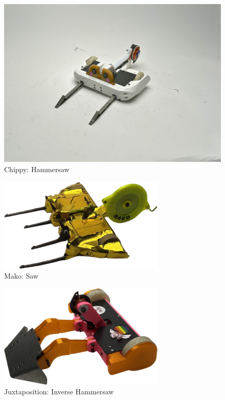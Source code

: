 \documentclass[conference]{IEEEtran}
\begin{document}
\begin{figure}[htp]
\centering
\includegraphics[scale=0.05]{chippy.jpg}
\caption{Chippy: Hammersaw \cite{b2}}
\label{Chippy: Hammersaw}
\end{figure}

\begin{figure}[htp]
\centering
\includegraphics[scale=0.4]{mako.png}
\caption{Mako: Saw \cite{b2}}
\label{Mako: Saw}
\end{figure}

\begin{figure}[htp]
\centering
\includegraphics[scale=0.4]{juxtaposition.png}
\caption{Juxtaposition: Inverse Hammersaw \cite{b2}}
\label{Juxtaposition: Inverse Hammersaw}
\end{figure}
\end{document}
